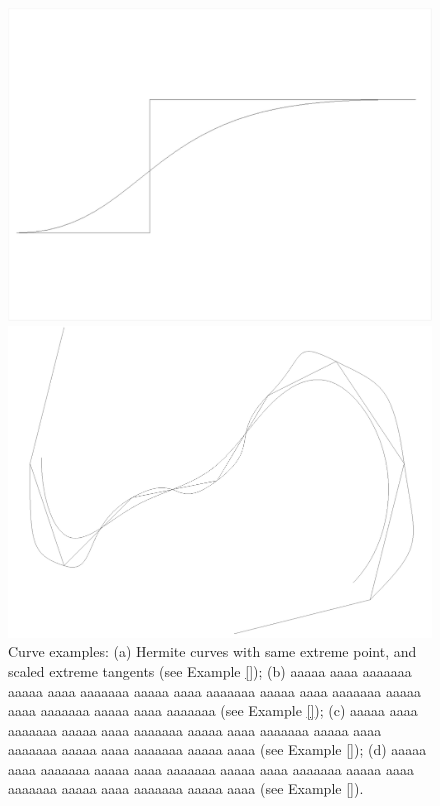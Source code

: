 \begin{coding}[Algebraic computation of FE = $\delta_1$]
{\begin{figure}[htbp]
	\begin{minipage}[c]{0.5\linewidth}
   	\includegraphics[width=\linewidth]{chapter-05/figs/bezier.pdf} 
	\end{minipage}%
	\begin{minipage}[c]{0.5\linewidth}
   	\includegraphics[width=\linewidth]{chapter-05/figs/nubspline.pdf} 
	\end{minipage}%

   \caption{Curve examples: (a) Hermite curves with same extreme point, and scaled extreme tangents (see Example \ref{}); (b) aaaaa aaaa aaaaaaa aaaaa aaaa aaaaaaa aaaaa aaaa aaaaaaa aaaaa aaaa aaaaaaa aaaaa aaaa aaaaaaa aaaaa aaaa aaaaaaa (see Example \ref{}); (c) aaaaa aaaa aaaaaaa aaaaa aaaa aaaaaaa aaaaa aaaa aaaaaaa aaaaa aaaa aaaaaaa aaaaa aaaa aaaaaaa aaaaa aaaa (see Example \ref{}); (d) aaaaa aaaa aaaaaaa aaaaa aaaa aaaaaaa aaaaa aaaa aaaaaaa aaaaa aaaa aaaaaaa aaaaa aaaa aaaaaaa aaaaa aaaa (see Example \ref{}). }
   \label{fig:5:7}
\end{figure}


}
\end{coding}
